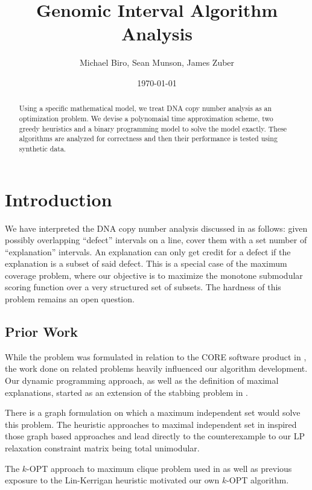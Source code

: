 \documentclass[11pt,twocolumn]{article}
\title{Genomic Interval Algorithm Analysis}
\author{Michael Biro, Sean Munson, James Zuber}
\date{\today}
\begin{document}
\maketitle

\begin{abstract} 
Using a specific mathematical model, we treat DNA copy number analysis as an optimization problem.  We devise a polynomaial time approximation scheme, two greedy heuristics and a binary programming model to solve the model exactly. These algorithms are analyzed for correctness and then their performance is tested using synthetic data.
\end{abstract}

\section{Introduction}

We have interpreted the DNA copy number analysis discussed in \cite{krasnitz2013target} as follows: given possibly overlapping ``defect'' intervals on a line, cover them with a set number of ``explanation'' intervals.  An explanation can only get credit for a defect if the explanation is a subset of said defect.  This is a special case of the maximum coverage problem, where our objective is to maximize the monotone submodular scoring function over a very structured set of subsets.  The hardness of this problem remains an open question.

\subsection{Prior Work} 

While the problem was formulated in relation to the CORE software product in \cite{krasnitz2013target}, the work done on related problems heavily influenced our algorithm development.  Our dynamic programming approach, as well as the definition of maximal explanations, started as an extension of the stabbing problem in \cite{katz2005orthogonal}. 

There is a graph formulation on which a maximum independent set would solve this problem. The heuristic approaches to maximal independent set in \cite{blelloch2012greedy} inspired those graph based approaches and lead directly to the counterexample to our LP relaxation constraint matrix being total unimodular. 

The $k$-OPT approach to maximum clique problem used in \cite{katayama2005effective} as well as previous exposure to the Lin-Kerrigan heuristic \cite{lin1973effective} motivated our own $k$-OPT algorithm.
\end{document}
